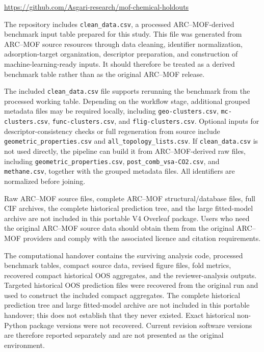 \documentclass[11pt,a4paper]{article}
\begin{document}
\begin{center}
\url{https://github.com/Asgari-research/mof-chemical-holdouts}
\end{center}

The repository includes \texttt{clean\_data.csv}, a processed ARC--MOF-derived benchmark input table prepared for this study. This file was generated from ARC--MOF source resources through data cleaning, identifier normalization, adsorption-target organization, descriptor preparation, and construction of machine-learning-ready inputs. It should therefore be treated as a derived benchmark table rather than as the original ARC--MOF release.

The included \texttt{clean\_data.csv} file supports rerunning the benchmark from the processed working table. Depending on the workflow stage, additional grouped metadata files may be required locally, including \texttt{geo-clusters.csv}, \texttt{mc-clusters.csv}, \texttt{func-clusters.csv}, and \texttt{flig-clusters.csv}. Optional inputs for descriptor-consistency checks or full regeneration from source include \texttt{geometric\_properties.csv} and \texttt{all\_topology\_lists.csv}. If \texttt{clean\_data.csv} is not used directly, the pipeline can build it from ARC--MOF-derived raw files, including \texttt{geometric\_properties.csv}, \texttt{post\_comb\_vsa-CO2.csv}, and \texttt{methane.csv}, together with the grouped metadata files. All identifiers are normalized before joining.

Raw ARC--MOF source files, complete ARC--MOF structural/database files, full CIF archives, the complete historical prediction tree, and the large fitted-model archive are not included in this portable V4 Overleaf package. Users who need the original ARC--MOF source data should obtain them from the original ARC--MOF providers and comply with the associated licence and citation requirements.

The computational handover contains the surviving analysis code, processed benchmark tables, compact source data, revised figure files, fold metrics, recovered compact historical OOS aggregates, and the reviewer-analysis outputs. Targeted historical OOS prediction files were recovered from the original run and used to construct the included compact aggregates. The complete historical prediction tree and large fitted-model archive are not included in this portable handover; this does not establish that they never existed. Exact historical non-Python package versions were not recovered. Current revision software versions are therefore reported separately and are not presented as the original environment.
\end{document}
